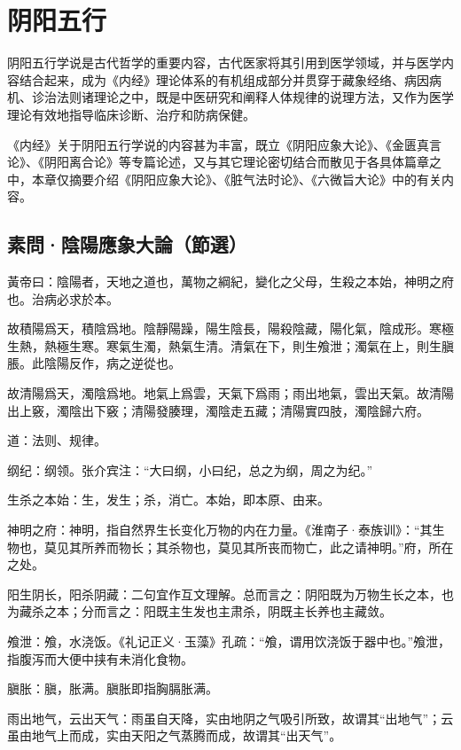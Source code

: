 \documentclass[12pt]{ctexbook}
\begin{document}
\pagestyle{main2}
\fi
\chapter{阴阳五行}%

阴阳五行学说是古代哲学的重要内容，古代医家将其引用到医学领域，并与医学内容结合起来，成为《内经》理论体系的有机组成部分并贯穿于藏象经络、病因病机、诊治法则诸理论之中，既是中医研究和阐释人体规律的说理方法，又作为医学理论有效地指导临床诊断、治疗和防病保健。

《内经》关于阴阳五行学说的内容甚为丰富，既立《阴阳应象大论》、《金匮真言论》、《阴阳离合论》等专篇论述，又与其它理论密切结合而散见于各具体篇章之中，本章仅摘要介绍《阴阳应象大论》、《脏气法时论》、《六微旨大论》中的有关内容。

\section{素問·陰陽應象大論（節選）}%


\begin{yuanwen}%
黃帝曰：陰陽者，天地之道也，萬物之綱紀，變化之父母，生殺之本始，神明之府也。治病必求於本。

故積陽爲天，積陰爲地。陰靜陽躁，陽生陰長，陽殺陰藏，陽化氣，陰成形。寒極生熱，熱極生寒。寒氣生濁，熱氣生清。清氣在下，則生飧泄；濁氣在上，則生䐜脹。此陰陽反作，病之逆從也。

故清陽爲天，濁陰爲地。地氣上爲雲，天氣下爲雨；雨出地氣，雲出天氣。故清陽出上竅，濁陰出下竅；清陽發腠理，濁陰走五藏；清陽實四肢，濁陰歸六府。
\end{yuanwen}


\begin{jiaozhu}
	\item 道：法则、规律。
	\item 纲纪：纲领。张介宾注：“大曰纲，小曰纪，总之为纲，周之为纪。”
	\item 生杀之本始：生，发生；杀，消亡。本始，即本原、由来。
	\item 神明之府：神明，指自然界生长变化万物的内在力量。《淮南子·泰族训》：“其生物也，莫见其所养而物长；其杀物也，莫见其所丧而物亡，此之请神明。”府，所在之处。
	\item 阳生阴长，阳杀阴藏：二句宜作互文理解。总而言之：阴阳既为万物生长之本，也为藏杀之本；分而言之：阳既主生发也主肃杀，阴既主长养也主藏敛。
	\item 飧泄：飧，水浇饭。《礼记正义·玉藻》孔疏：“飧，谓用饮浇饭于器中也。”飧泄，指腹泻而大便中挟有未消化食物。
	\item 䐜胀：䐜，胀满。䐜胀即指胸膈胀满。
	\item 雨出地气，云出天气：雨虽自天降，实由地阴之气吸引所致，故谓其“出地气”；云虽由地气上而成，实由天阳之气蒸腾而成，故谓其“出天气”。
\end{jiaozhu}
\end{document}
